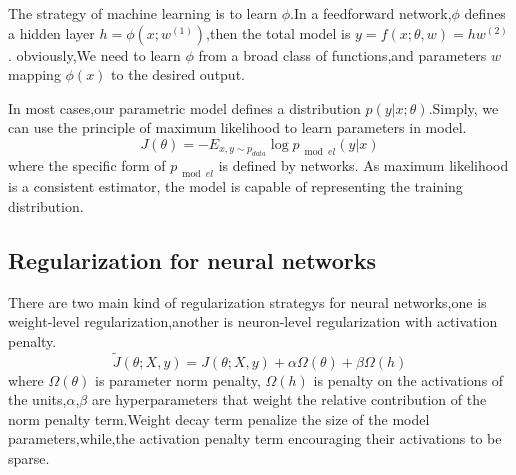 The strategy of machine learning is to learn $\phi$.In a feedforward network,$\phi$ defines a hidden layer $h=\phi(x;w^{(1)})$,then the total model is $y=f(x;\theta,w)=hw^{(2)}$.
obviously,We need to learn $\phi$ from a broad class of functions,and parameters $w$ mapping $\phi(x)$ to the desired output.

In most cases,our parametric model defines a distribution $p(y|x;\theta)$.Simply, we can use the principle of maximum likelihood to learn parameters in model.
\begin{equation}
J(\theta ) =  - {E_{x,y \sim {p_{data}}}}\log {p_{\bmod el}}(y|x)
\end{equation}
where the specific form of $p_{\bmod el}$ is defined by networks.
As maximum likelihood is a consistent estimator, the model is capable of representing the training distribution.

\subsection{Regularization for neural networks}

There are two main kind of regularization strategys for neural networks,one is weight-level regularization,another is neuron-level regularization with activation penalty.
\begin{equation}
\tilde J(\theta ;X,y) = J(\theta ;X,y) + \alpha \Omega (\theta )+ \beta \Omega (h)
\end{equation}
where $\Omega (\theta )$ is parameter norm penalty, $\Omega (h)$ is penalty on the activations of the units,$\alpha$,$\beta$ are hyperparameters that weight the relative contribution of
the norm penalty term.Weight decay term penalize the size of the model parameters,while,the activation penalty term encouraging their activations to be sparse.


